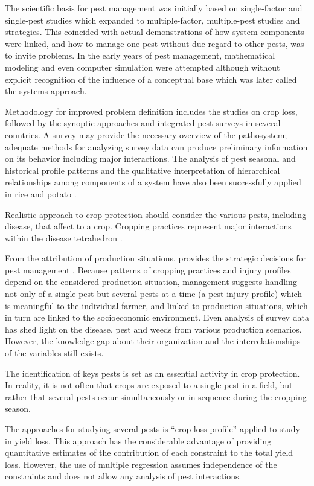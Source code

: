 The scientific basis for pest management was initially based on single-factor and single-pest studies which expanded to multiple-factor, multiple-pest studies and strategies. This coincided with actual demonstrations of how system components were linked, and how to manage one pest without due regard to other pests, was to invite problems. In the early years of pest management, mathematical modeling and even computer simulation were attempted although without explicit recognition of the influence of a conceptual base which was later called the systems approach.

Methodology for improved problem definition includes the studies on crop loss, followed by the synoptic approaches and integrated pest surveys in several countries. A survey may provide the necessary overview of the pathosystem; adequate methods for analyzing survey data can produce preliminary information on its behavior including major interactions. The analysis of pest seasonal and historical profile patterns and the qualitative interpretation of hierarchical relationships among components of a system have also been successfully applied in rice and potato \citep{teng1992implementing, heong1985systems}. 

Realistic approach to crop protection should consider the various pests, including disease, that affect to a crop. Cropping practices represent major interactions within the disease tetrahedron \cite{Zadoks:1979ts}.

From the attribution of production situations, provides the strategic decisions for pest management \cite{Mew:2004kh}. Because patterns of cropping practices and injury profiles depend on the considered production situation, management suggests handling not only of a single pest but several pests at a time (a pest injury profile) which is meaningful to the individual farmer, and linked to production situations, which in turn are linked to the socioeconomic environment. 
Even analysis of survey data has shed light on the disease, pest and weeds from various production scenarios. However, the knowledge gap about their organization and the interrelationships of the variables still exists.

The identification of keys pests is set as an essential activity in crop protection. In reality, it is not often that crops are exposed to a single pest in a field, but rather that several pests occur simultaneously or in sequence during the cropping season. 

The approaches for studying several pests is ``crop loss profile'' applied to study in yield loss. This approach has the considerable advantage of providing quantitative estimates of the contribution of each constraint to the total yield loss. However, the use of multiple regression assumes independence of the constraints and does not allow any analysis of pest interactions.

